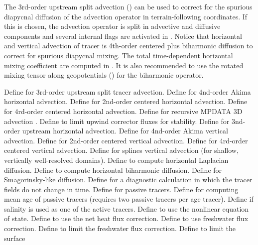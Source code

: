 \begin{klist}
The 3rd-order upstream split advection () can be used
to correct for the spurious diapycnal diffusion of the advection
operator in terrain-following coordinates. If this is chosen, the
advection operator is split in advective and diffusive components
and several internal flags are activated in .  Notice
that horizontal and vertical advection of tracer is 4th-order centered
plus biharmonic diffusion to correct for spurious diapycnal mixing.
The total time-dependent horizontal mixing coefficient are computed
in . It is also recommended to use the rotated mixing
tensor along geopotentials () for the biharmonic
operator.
  \begin{klist}
     Define for 3rd-order upstream split
  tracer advection.
     Define for 4nd-order Akima horizontal advection.
     Define for 2nd-order centered horizontal
advection.
     Define for 4rd-order centered horizontal
advection.
     Define for recursive MPDATA 3D advection
  \citep{Margolin_98}.
     Define to limit upwind corrector
  fluxes for stability.
     Define for 3nd-order upstream horizontal advection.
     Define for 4nd-order Akima vertical advection.
     Define for 2nd-order centered vertical
advection.
     Define for 4rd-order centered vertical
advection.
     Define for splines vertical advection
 (for shallow, vertically well-resolved domains).
         Define to compute
  horizontal Laplacian diffusion.
         Define to compute
  horizontal biharmonic diffusion.
     Define for Smagorinsky-like diffusion.
      Define for a diagnostic
  calculation in which the tracer fields do not change in time.
      Define for passive tracers.
      Define for computing mean age of passive
  tracers (requires two passive tracers per age tracer).
          Define if salinity is used as one of the
  active tracers.
     Define to use the nonlinear
  equation of state.
      Define to use the net heat
  flux correction.
      Define to use freshwater flux correction.
      Define to limit the freshwater flux
  correction.
      Define to limit the surface

\end{klist}
\end{klist}
